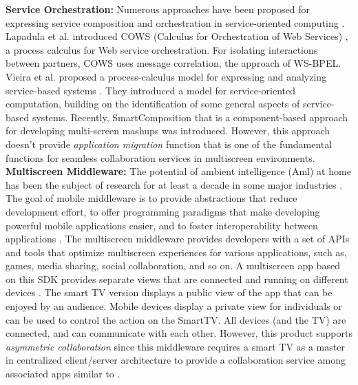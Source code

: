 \documentclass[conference]{IEEEtran}
\begin{document}
\noindent
\textbf{Service Orchestration:}
Numerous approaches have been proposed for expressing service composition and orchestration in service-oriented computing \cite{ehsan2013, Lanese:2007}. 
Lapadula et al. introduced COWS (Calculus for Orchestration of Web Services) \cite{Lapadula:2007}, a process calculus for Web service orchestration. For isolating interactions between partners, COWS uses message correlation, the approach of WS-BPEL.
Vieira et al. proposed a process-calculus model for expressing and analyzing service-based systems \cite{Vieira:2008}.
They introduced a model for service-oriented computation, building on the identification of some general aspects of service-based systems. 
Recently, SmartComposition \cite{MKrug2014} that is a component-based approach for developing multi-screen mashups was introduced. 
However, this approach doesn't provide \textit{application migration} function that is one of the fundamental functions for seamless collaboration services in multiscreen environments.\\

\noindent
\textbf{Multiscreen Middleware:}
The potential of ambient intelligence (Aml) at home has been the subject of research for at least a decade in some major industries \cite{Aarts:2004} .
The goal of mobile middleware is to provide abstractions that reduce development effort, to offer programming paradigms that make developing powerful mobile applications easier, and to foster interoperability between applications \cite{DBLP:FuentesPCM06}.
The multiscreen middleware provides developers with a set of APIs and tools that optimize multiscreen experiences for various applications, such as, games, media sharing, social collaboration, and so on.
A multiscreen app based on this SDK provides separate views that are connected and running on different devices \cite{samsung:2014}. 
The smart TV version displays a public view of the app that can be enjoyed by an audience. 
Mobile devices display a private view for individuals or can be used to control the action on the SmartTV. 
All devices (and the TV) are connected, and can communicate with each other.
However, this product supports  \textit{asymmetric collaboration} since this middleware requires a smart TV as a master in centralized client/server architecture to provide a collaboration service among associated apps similar to \cite{Ma:2008}.\\
\end{document}
